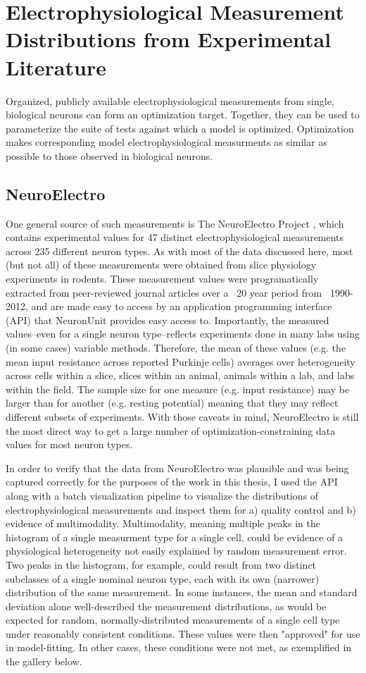 \section{Electrophysiological Measurement Distributions from Experimental Literature}\label{section:nelectro}
Organized, publicly available electrophysiological measurements from single, biological neurons can form an optimization target.
Together, they can be used to parameterize the suite of tests against which a model is optimized.
Optimization makes corresponding model electrophysiological measurments as similar as possible to those observed in biological neurons.

\subsection{NeuroElectro}
One general source of such measurements is The NeuroElectro Project \cite{tripathy2014neuroelectro}, which contains experimental values for 47 distinct electrophysiological measurements across 235 different neuron types.
As with most of the data discussed here, most (but not all) of these measurements were obtained from slice physiology experiments in rodents.
These measurement values were programatically extracted from peer-reviewed journal articles over a ~20 year period from ~1990-2012,
and are made easy to access by an application programming interface (API) that NeuronUnit provides easy access to.
Importantly, the measured values--even for a single neuron type--reflects experiments done in many labs using (in some cases) variable methods.
Therefore, the mean of these values (e.g. the mean input resistance across reported Purkinje cells) averages over heterogeneity across cells within a slice, slices within an animal, animals within a lab, and labs within the field.
The sample size for one measure (e.g. input resistance) may be larger than for another (e.g. resting potential) meaning that they may reflect different subsets of experiments.
With those caveats in mind, NeuroElectro is still the most direct way to get a large number of optimization-constraining data values for most neuron types.

In order to verify that the data from NeuroElectro was plausible and was being captured correctly for the purposes of the work in this thesis, I used the API along with a batch visualization pipeline to  visualize the distributions of electrophysiological measurements and inspect them for a) quality control and b) evidence of multimodality.
Multimodality, meaning multiple peaks in the histogram of a single measurment type for a single cell, could be evidence of a physiological heterogeneity not easily explained by random measurement error.
Two peaks in the histogram, for example, could result from two distinct subclasses of a single nominal neuron type, each with its own (narrower) distribution of the same measurement.
In some instances, the mean and standard deviation alone well-described the measurement distributions, as would be expected for random, normally-distributed measurements of a single cell type under reasonably consistent conditions.
These values were then "approved" for use in model-fitting.
In other cases, these conditions were not met, as exemplified in the gallery below.

